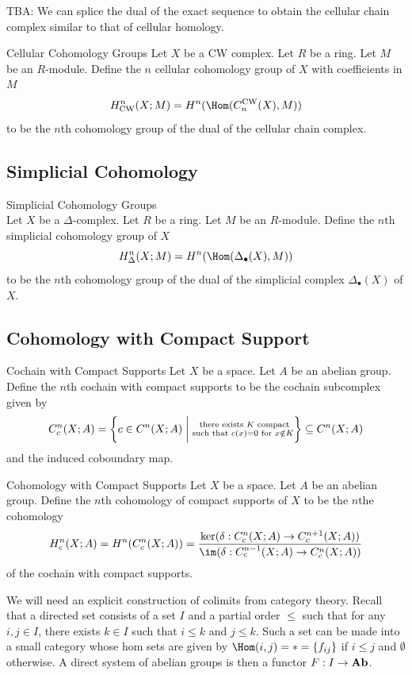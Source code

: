 \documentclass[a4paper]{article}
\begin{document}
TBA: We can splice the dual of the exact sequence to obtain the cellular chain complex similar to that of cellular homology. 

\begin{defn}{Cellular Cohomology Groups}{} Let $X$ be a CW complex. Let $R$ be a ring. Let $M$ be an $R$-module. Define the $n$ cellular cohomology group of $X$ with coefficients in $M$ $$H_\text{CW}^n(X;M)=H^n(\Hom(C_n^\text{CW}(X),M))$$ to be the $n$th cohomology group of the dual of the cellular chain complex. 
\end{defn}

\subsection{Simplicial Cohomology}
\begin{defn}{Simplicial Cohomology Groups}{}\\
Let $X$ be a $\Delta$-complex. Let $R$ be a ring. Let $M$ be an $R$-module. Define the $n$th simplicial cohomology group of $X$ $$H_\Delta^n(X;M)=H^n(\Hom(\Delta_\bullet(X),M))$$ to be the $n$th cohomology group of the dual of the simplicial complex $\Delta_\bullet(X)$ of $X$. 
\end{defn}

\subsection{Cohomology with Compact Support}
\begin{defn}{Cochain with Compact Supports}{} Let $X$ be a space. Let $A$ be an abelian group. Define the $n$th cochain with compact supports to be the cochain subcomplex given by $$C_c^n(X;A)=\left\{c\in C^n(X;A)\;\bigg{|}\;\substack{\text{ there exists }K\text{ compact}\\\text{such that }c(x)=0\text{ for }x\notin K}\right\}\subseteq C^n(X;A)$$ and the induced coboundary map. 
\end{defn}

\begin{defn}{Cohomology with Compact Supports}{} Let $X$ be a space. Let $A$ be an abelian group. Define the $n$th cohomology of compact supports of $X$ to be the $n$the cohomology $$H_c^n(X;A)=H^n(C_c^n(X;A))=\frac{\ker(\delta:C_c^n(X;A)\to C_c^{n+1}(X;A))}{\im(\delta:C_c^{n-1}(X;A)\to C_c^n(X;A))}$$ of the cochain with compact supports. 
\end{defn}

We will need an explicit construction of colimits from category theory. Recall that a directed set consists of a set $I$ and a partial order $\leq$ such that for any $i,j\in I$, there exists $k\in I$ such that $i\leq k$ and $j\leq k$. Such a set can be made into a small category whose hom sets are given by $\Hom(i,j)=\ast=\{f_{ij}\}$ if $i\leq j$ and $\emptyset$ otherwise. A direct system of abelian groups is then a functor $F:I\to\bold{Ab}$. \\
\end{document}
